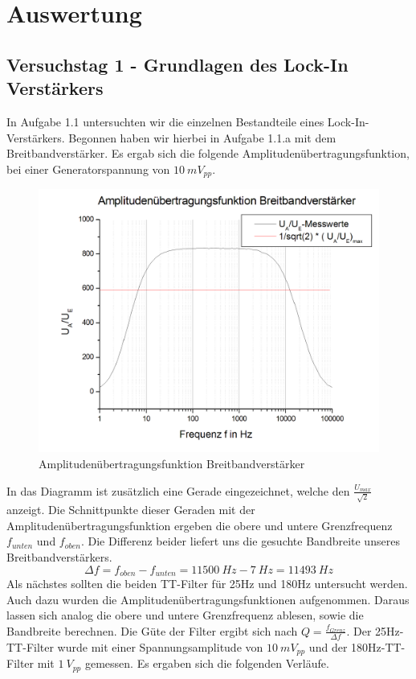 \documentclass{scrartcl}						%
\begin{document}
	\clearpage
				 
\section{Auswertung}		
		\subsection{Versuchstag 1 - Grundlagen des Lock-In Verstärkers}
			In Aufgabe 1.1 untersuchten wir die einzelnen Bestandteile eines Lock-In-Verstärkers. Begonnen haben wir hierbei in Aufgabe 1.1.a mit dem Breitbandverstärker. Es ergab sich die folgende Amplitudenübertragungsfunktion, bei einer Generatorspannung von $ 10 \ mV_{pp} $.
			
			\begin{figure}[h!]
				\centering
				\includegraphics[scale=0.4]{A1a}
				\caption{Amplitudenübertragungsfunktion Breitbandverstärker}
			\end{figure}
			In das Diagramm ist zusätzlich eine Gerade eingezeichnet, welche den $ \frac{U_{max}}{\sqrt{2}} $ anzeigt. Die Schnittpunkte dieser Geraden mit der Amplitudenübertragungsfunktion ergeben die obere und untere Grenzfrequenz $ f_{unten} $ und $ f_{oben} $. Die Differenz beider liefert uns die gesuchte Bandbreite unseres Breitbandverstärkers.
			\begin{equation*}
				\Delta f=f_{oben}-f_{unten}=11500 \ Hz - 7 \ Hz = 11493 \ Hz
			\end{equation*}
			\newline
			Als nächstes sollten die beiden TT-Filter für 25Hz und 180Hz untersucht werden. Auch dazu wurden die Amplitudenübertragungsfunktionen aufgenommen. Daraus lassen sich analog die obere und untere Grenzfrequenz ablesen, sowie die Bandbreite berechnen. Die Güte der Filter ergibt sich nach $ Q=\frac{f_{Grenz}}{\Delta f} $. Der 25Hz-TT-Filter wurde mit einer Spannungsamplitude von $10 \ mV_{pp}$ und der 180Hz-TT-Filter mit $1\ V_{pp}$ gemessen. Es ergaben sich die folgenden Verläufe.
\end{document}
